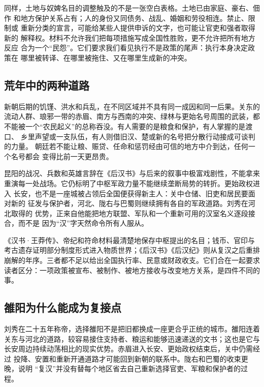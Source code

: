 同样，土地与奴婢名目的调整触及的不是一张空白表格。土地已由家庭、豪右、佃作
和地方保护关系占有；人的身份又同债务、战乱、婚姻和劳役相连。禁止、限制或
重新分类的宣言，可能给某些人提供申诉的文字，也可能让官吏和强者取得新的
解释权。材料不允许我们把每项措施写成全国性胜败，更不允许把所有地方反应
合为一个“民怨”。它们要求我们看见执行不是政策的尾声：执行本身决定政策在
哪里被转译、在哪里被拖住、又在哪里生成新的冲突。

\subsection{荒年中的两种道路}

新朝后期的饥馑、洪水和兵乱，在不同区域并不具有同一成因和同一后果。关东的
流动人群、琅邪一带的赤眉、南方与西南的冲突、绿林与更始名号周围的武装，都
不能被一个“农民起义”的总称吞没。有人需要的是粮食和保护，有人掌握的是渡口、
乡里声望或一支队伍，有人则借旧汉、楚或新的名号把分散行动接成可谈判的力量。
朝廷若不能让粮、赈贷、任命和惩罚经由可信的地方中介到达，任何一个名号都会
变得比前一天更昂贵。

昆阳的战况、兵数和英雄言辞在《后汉书》与后来的叙事中极富戏剧性，不能拿来
重演每一处战场。它仍标明了中枢军政力量不能继续垄断局势的转折。更始政权进入
长安，也不是一座城被占领后全国便获得新主人：关中仓储、旧吏和居民要面对新的
征发与保护者，河北、陇右与巴蜀则继续拥有各自的军政道路。刘秀在河北取得的
优势，正来自他能把地方联盟、军队和一个重新可用的汉室名义逐段接合，而不是
因为“汉”字天然命令所有人服从。

\begin{sourcenote}[王莽改革为何不能只按成败读]
《汉书·王莽传》、帝纪和符命材料最清楚地保存中枢提出的名目；钱币、官印与
考古遗存证明部分制度形式进入物质世界；《后汉书》《后汉纪》则从复汉之后重排
崩解的年序。三者都不足以给出全国执行率、民意或财政收支。它们合在一起要求
读者区分：一项政策被宣布、被制作、被地方接收与改变地方关系，是四件不同的事。
\end{sourcenote}

\subsection{雒阳为什么能成为复接点}

刘秀在二十五年称帝，选择雒阳不是把旧都换成一座更合乎正统的城市。雒阳连着
关东与河北的道路，较容易接住支持者、粮运和能够迅速递送的文书；这也是它与
长安周边持续动荡相比的现实优势。赤眉进入长安、更始政权结束后，关中仍需经过
投降、安置和重新开通道路才可能回到新朝的联系中。陇右和巴蜀的收束更晚，说明
“复汉”并没有替每个地区省去自己重新选择官吏、军粮和保护者的过程。

